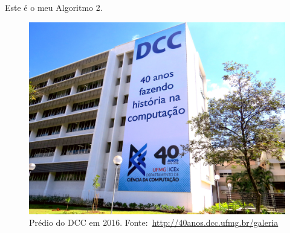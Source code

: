 \documentclass[
	phd, %
	english %
]{ppgccufmg}
\begin{document}
		\begin{algoritmo}
			\centering
			\caption{Este é o meu Algoritmo 2.}
			\label{alg:algoritmo2}
		\end{algoritmo}
		
		\begin{figure}[h]
			\centering
			\includegraphics[width=\textwidth]{img/dcc.jpg}
			\caption{Prédio do DCC em 2016. Fonte:~\url{http://40anos.dcc.ufmg.br/galeria}}
			\label{fig:exemplo}
		\end{figure}
	
		\lipsum[5]
		
\end{document}

